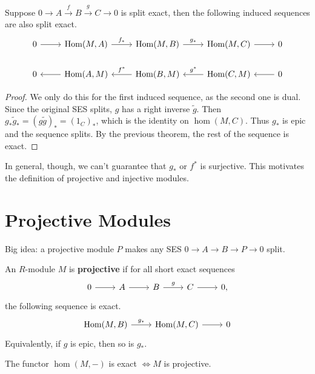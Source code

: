 \documentclass[twoside,10pt]{report}
\begin{document}
\begin{cor}[]
	Suppose $0 \to A \stackrel{f}{\to } B \stackrel{g}{\to } C\to 0$ is split exact, then the following induced sequences are also split exact.
	\[
	\begin{tikzcd}
		0 \rar & \hom(M,A) \rar{f_{*}} & \hom(M,B) \rar{g_{*}} & \hom(M,C)\rar & 0 \\
		0 & \hom(A,M)\lar & \hom(B,M)\lar["f^{*}"'] & \hom(C,M)\lar["g^{*}"'] & 0\lar
	\end{tikzcd}
	\]
\end{cor}
\begin{proof}
	We only do this for the first induced sequence, as the second one is dual. Since the original SES splits, $g$ has a right inverse $\tilde{g}$. Then $g_{*}\tilde{g}_{*} = (g\tilde{g})_{*} = (1_{C})_{*}$, which is the identity on $\hom(M,C)$. Thus $g_{*}$ is epic and the sequence splits. By the previous theorem, the rest of the sequence is exact.
\end{proof}

In general, though, we can't guarantee that $g_{*}$ or $f^{*}$ is surjective. This motivates the definition of projective and injective modules.

\section{Projective Modules}

\begin{note}[]
	Big idea: a projective module $P$ makes any SES $0\to A \to B \to P \to 0$ split.
\end{note}

\begin{defn}[]
An $R$-module $M$ is \textbf{projective} if for all short exact sequences
\[
        \begin{tikzcd}
                0 \rar & A \rar & B\rar{g} & C \rar & 0,
        \end{tikzcd} 
\] the following sequence is exact.
\[
	\begin{tikzcd}
		\hom(M,B) \rar{g_{*}} & \hom(M,C) \rar & 0
	\end{tikzcd}
\] Equivalently, if $g$ is epic, then so is $g_{*}$.
\end{defn}

\begin{prop}
	The functor $\hom(M,-)$ is exact $\iff M$ is projective.
\end{prop}
\end{document}
